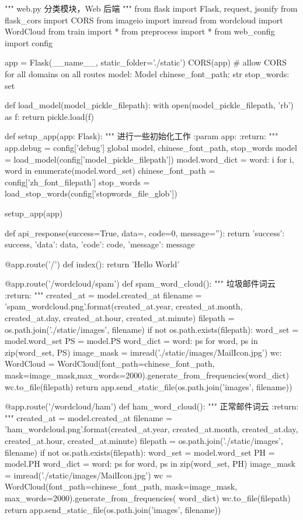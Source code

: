 \documentclass[UTF8,zihao=-4]{ctexart}
\begin{document}
\begin{python}
"""
web.py
分类模块，Web 后端
"""
from flask import Flask, request, jsonify
from flask_cors import CORS
from imageio import imread
from wordcloud import WordCloud
from train import *
from preprocess import *
from web_config import config

app = Flask(__name__, static_folder='./static')
CORS(app)  # allow CORS for all domains on all routes
model: Model
chinese_font_path: str
stop_words: set


def load_model(model_pickle_filepath):
    with open(model_pickle_filepath, 'rb') as f:
        return pickle.load(f)


def setup_app(app: Flask):
    """
    进行一些初始化工作
    :param app:
    :return:
    """
    app.debug = config['debug']
    global model, chinese_font_path, stop_words
    model = load_model(config['model_pickle_filepath'])
    model.word_dict = {word: i for i, word in enumerate(model.word_set)}
    chinese_font_path = config['zh_font_filepath']
    stop_words = load_stop_words(config['stopwords_file_glob'])


setup_app(app)


def api_response(success=True, data={}, code=0, message=''):
    return {
        'success': success,
        'data': data,
        'code': code,
        'message': message
    }


@app.route('/')
def index():
    return 'Hello World'


@app.route('/wordcloud/spam')
def spam_word_cloud():
    """
    垃圾邮件词云
    :return:
    """
    created_at = model.created_at
    filename = 'spam_wordcloud{}{}{}{}{}.png'.format(created_at.year, created_at.month, created_at.day, created_at.hour,
                                                     created_at.minute)
    filepath = os.path.join('./static/images', filename)
    if not os.path.exists(filepath):
        word_set = model.word_set
        PS = model.PS
        word_dict = {word: ps for word, ps in zip(word_set, PS)}
        image_mask = imread('./static/images/MailIcon.jpg')
        wc: WordCloud = WordCloud(font_path=chinese_font_path, mask=image_mask,max_words=2000).generate_from_frequencies(word_dict)
        wc.to_file(filepath)
    return app.send_static_file(os.path.join('images', filename))


@app.route('/wordcloud/ham')
def ham_word_cloud():
    """
    正常邮件词云
    :return:
    """
    created_at = model.created_at
    filename = 'ham_wordcloud{}{}{}{}{}.png'.format(created_at.year, created_at.month, created_at.day, created_at.hour,
                                                    created_at.minute)
    filepath = os.path.join('./static/images', filename)
    if not os.path.exists(filepath):
        word_set = model.word_set
        PH = model.PH
        word_dict = {word: ps for word, ps in zip(word_set, PH)}
        image_mask = imread('./static/images/MailIcon.jpg')
        wc = WordCloud(font_path=chinese_font_path, mask=image_mask, max_words=2000).generate_from_frequencies(
            word_dict)
        wc.to_file(filepath)
    return app.send_static_file(os.path.join('images', filename))



\end{python}
\end{document}
